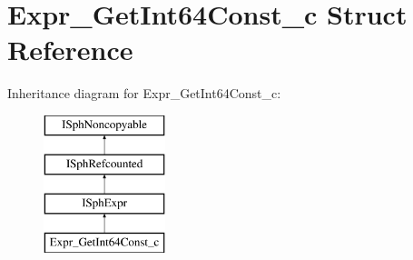 \hypertarget{structExpr__GetInt64Const__c}{\section{Expr\-\_\-\-Get\-Int64\-Const\-\_\-c Struct Reference}
\label{structExpr__GetInt64Const__c}
}
Inheritance diagram for Expr\-\_\-\-Get\-Int64\-Const\-\_\-c\-:\begin{figure}[H]
\begin{center}
\leavevmode
\includegraphics[height=4.000000cm]{structExpr__GetInt64Const__c}
\end{center}
\end{figure}
